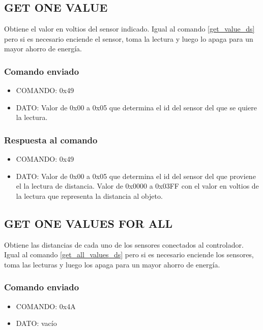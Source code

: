\documentclass[a4paper,10pt]{article}
\begin{document}
\subsection{GET ONE VALUE}
\label{get_one_value_ds}

Obtiene el valor en voltios del sensor indicado.
Igual al comando \ref{get_value_ds} pero si es necesario enciende el sensor, toma la lectura y luego lo apaga para un mayor ahorro de energ\'ia.

\subsubsection*{Comando enviado}

\begin{itemize}
	\item{COMANDO:} 0x49
	\item{DATO:} Valor de 0x00 a 0x05 que determina el id del sensor del que se quiere la lectura.
\end{itemize}

\subsubsection*{Respuesta al comando}

\begin{itemize}
	\item{COMANDO:} 0x49
	\item{DATO:} Valor de 0x00 a 0x05 que determina el id del sensor del que proviene el la lectura de distancia.
	Valor de 0x0000 a 0x03FF con el valor en voltios de la lectura que representa la distancia al objeto.
\end{itemize}

\subsection{GET ONE VALUES FOR ALL}
\label{get_one_values_for_all_ds}

Obtiene las distancias de cada uno de los sensores conectados al controlador.
Igual al comando \ref{get_all_values_ds} pero si es necesario enciende los sensores, toma las lecturas y luego los apaga para un mayor ahorro de energ\'ia.

\subsubsection*{Comando enviado}

\begin{itemize}
	\item{COMANDO:} 0x4A
	\item{DATO:} vac\'io
\end{itemize}
\end{document}
